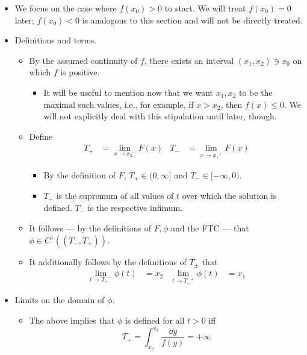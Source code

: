 \documentclass[../notes.tex]{subfiles}
\begin{document}
\begin{itemize}
    \item We focus on the case where $f(x_0)>0$ to start. We will treat $f(x_0)=0$ later; $f(x_0)<0$ is analogous to this section and will not be directly treated.
    \item Definitions and terms.
    \begin{itemize}
        \item By the assumed continuity of $f$, there exists an interval $(x_1,x_2)\ni x_0$ on which $f$ is positive.
        \begin{itemize}
            \item It will be useful to mention now that we want $x_1,x_2$ to be the maximal such values, i.e., for example, if $x>x_2$, then $f(x)\leq 0$. We will not explicitly deal with this stipulation until later, though.
        \end{itemize}
        \item Define
        \begin{align*}
            T_+ &= \lim_{x\to{x_2}^-}F(x)&
            T_- &= \lim_{x\to{x_1}^+}F(x)
        \end{align*}
        \begin{itemize}
            \item By the definition of $F$, $T_+\in(0,\infty]$ and $T_-\in[-\infty,0)$.
            \item $T_+$ is the supremum of all values of $t$ over which the solution is defined. $T_-$ is the respective infimum.
        \end{itemize}
        \item It follows --- by the definitions of $F,\phi$ and the FTC --- that $\phi\in C^1((T_-,T_+))$.
        \item It additionally follows by the definitions of $T_\pm$ that
        \begin{align*}
            \lim_{t\to{T_+}^-}\phi(t) &= x_2&
            \lim_{t\to{T_-}^+}\phi(t) &= x_1
        \end{align*}
    \end{itemize}
    \item Limits on the domain of $\phi$.
    \begin{itemize}
        \item The above implies that $\phi$ is defined for all $t>0$ iff
        \begin{equation*}
            T_+ = \int_{x_0}^{x_2}\frac{\dd{y}}{f(y)} = +\infty
        \end{equation*}
        \begin{itemize}

\end{itemize}
\end{itemize}
\end{itemize}
\end{document}
